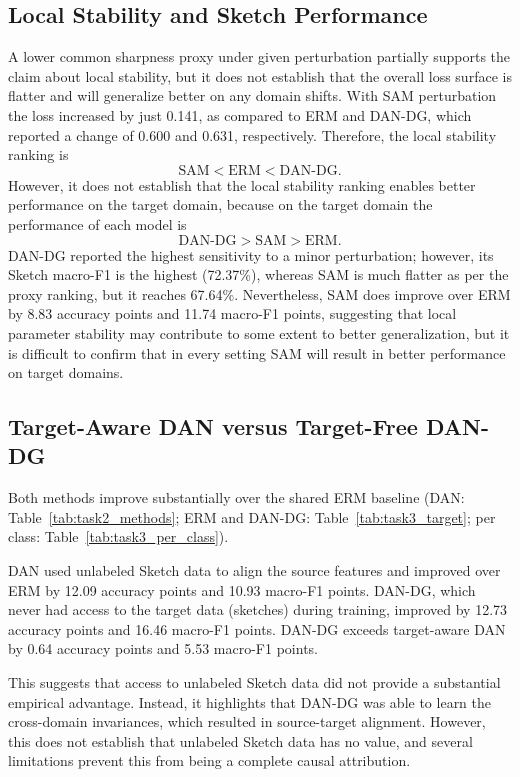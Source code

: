 \subsection{Local Stability and Sketch Performance}



A lower common sharpness proxy under given perturbation partially supports the claim about local stability, but it does not establish that the overall loss surface is flatter and will generalize better on any domain shifts. With SAM perturbation the loss increased by just 0.141, as compared to ERM and DAN-DG, which reported a change of 0.600 and 0.631, respectively. Therefore, the local stability ranking is
\[ \text{SAM} < \text{ERM} < \text{DAN-DG}. \]
However, it does not establish that the local stability ranking enables better performance on the target domain, because on the target domain the performance of each model is
\[ \text{DAN-DG} > \text{SAM} > \text{ERM}. \]
DAN-DG reported the highest sensitivity to a minor perturbation; however, its Sketch macro-F1 is the highest (72.37\%), whereas SAM is much flatter as per the proxy ranking, but it reaches 67.64\%. Nevertheless, SAM does improve over ERM by 8.83 accuracy points and 11.74 macro-F1 points, suggesting that local parameter stability may contribute to some extent to better generalization, but it is difficult to confirm that in every setting SAM will result in better performance on target domains.

\subsection{Target-Aware DAN versus Target-Free DAN-DG}

Both methods improve substantially over the shared ERM baseline (DAN: Table~\ref{tab:task2_methods}; ERM and DAN-DG: Table~\ref{tab:task3_target}; per class: Table~\ref{tab:task3_per_class}).

DAN used unlabeled Sketch data to align the source features and improved over ERM by 12.09 accuracy points and 10.93 macro-F1 points. DAN-DG, which never had access to the target data (sketches) during training, improved by 12.73 accuracy points and 16.46 macro-F1 points. DAN-DG exceeds target-aware DAN by 0.64 accuracy points and 5.53 macro-F1 points.

This suggests that access to unlabeled Sketch data did not provide a substantial empirical advantage. Instead, it highlights that DAN-DG was able to learn the cross-domain invariances, which resulted in source-target alignment. However, this does not establish that unlabeled Sketch data has no value, and several limitations prevent this from being a complete causal attribution.



